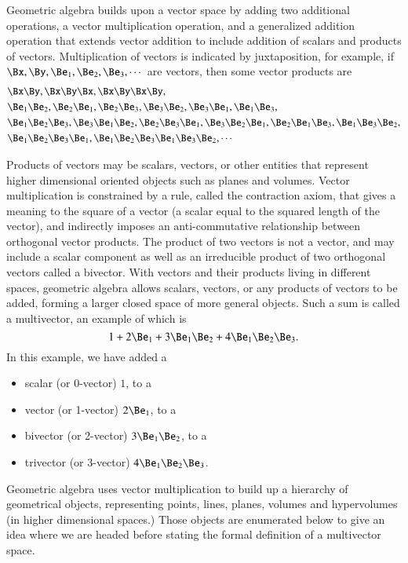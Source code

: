 %
%
Geometric algebra builds upon a vector space by adding two additional operations, a vector multiplication operation, and a generalized addition operation that extends vector addition to include addition of scalars and products of vectors.
Multiplication of vectors is indicated by juxtaposition, for example, if \( \Bx, \By, \Be_1, \Be_2, \Be_3, \cdots \) are vectors, then some vector products are
\begin{dmath}\label{eqn:multivector:20}
\begin{aligned}
&\Bx \By, \Bx \By \Bx, \Bx \By \Bx \By, \\
&\Be_1 \Be_2, \Be_2 \Be_1, \Be_2 \Be_3, \Be_3 \Be_2, \Be_3 \Be_1, \Be_1 \Be_3, \\
&\Be_1 \Be_2 \Be_3, \Be_3 \Be_1 \Be_2, \Be_2 \Be_3 \Be_1, \Be_3 \Be_2 \Be_1, \Be_2 \Be_1 \Be_3, \Be_1 \Be_3 \Be_2, \\
&\Be_1 \Be_2 \Be_3 \Be_1, \Be_1 \Be_2 \Be_3 \Be_1 \Be_3 \Be_2, \cdots
\end{aligned}
\end{dmath}

Products of vectors may be scalars, vectors, or other entities that represent higher dimensional oriented objects such as planes and volumes.
Vector multiplication is constrained by a rule, called the contraction axiom, that gives a meaning to the square of a vector (a scalar equal to the squared length of the vector), and indirectly imposes an anti-commutative relationship between orthogonal vector products.
%
The product of two vectors is not a vector, and may include a scalar component as well as an irreducible product of two orthogonal vectors called a bivector.
With vectors and their products living in different spaces,
geometric algebra allows scalars, vectors, or any products of vectors to be added, forming a larger closed space of more general objects.  Such a sum is called a multivector, an example of which is
\begin{dmath}\label{eqn:multivector:40}
1 + 2 \Be_1 + 3 \Be_1 \Be_2 + 4 \Be_1 \Be_2 \Be_3.
\end{dmath}
In this example, we have added a
\begin{itemize}
\item
scalar (or 0-vector) \( 1 \), to a
\item
vector (or 1-vector) \( 2 \Be_1 \), to a
\item
bivector (or 2-vector) \( 3 \Be_1 \Be_2 \), to a
\item
trivector (or 3-vector) \( 4 \Be_1 \Be_2 \Be_3 \).
\end{itemize}
Geometric algebra uses vector multiplication to build up a hierarchy of geometrical objects, representing points, lines, planes, volumes and hypervolumes (in higher dimensional spaces.)  Those objects are enumerated below to give an idea where we are headed before stating the formal definition of a multivector space.

